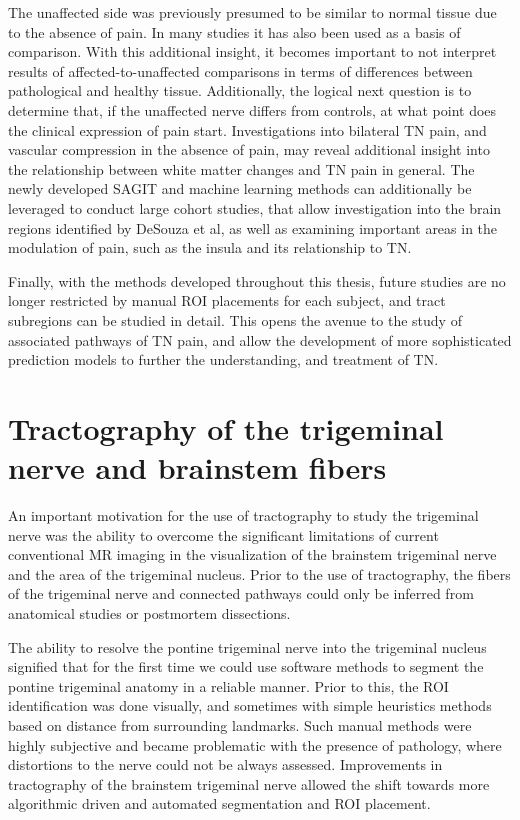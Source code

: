The unaffected side was previously presumed to be similar to normal tissue due to the absence of pain. In many studies it has also been used as a basis of comparison. With this additional insight, it becomes important to not interpret results of affected-to-unaffected comparisons in terms of differences between pathological and healthy tissue. Additionally, the logical next question is to determine that, if the unaffected nerve differs from controls, at what point does the clinical expression of pain start. Investigations into bilateral TN pain, and vascular compression in the absence of pain, may reveal additional insight into the relationship between white matter changes and TN pain in general. The newly developed SAGIT and machine learning methods can additionally be leveraged to conduct large cohort studies, that allow investigation into the brain regions identified by DeSouza et al, as well as examining important areas in the modulation of pain, such as the insula and its relationship to TN. 

Finally, with the methods developed throughout this thesis, future studies are no longer restricted by manual ROI placements for each subject, and tract subregions can be studied in detail. This opens the avenue to the study of associated pathways of TN pain, and allow the development of more sophisticated prediction models to further the understanding, and treatment of TN. 

\section{Tractography of the trigeminal nerve and brainstem fibers}

An important motivation for the use of tractography to study the trigeminal nerve was the ability to overcome the significant limitations of current conventional MR imaging in the visualization of the brainstem trigeminal nerve and the area of the trigeminal nucleus. Prior to the use of tractography, the fibers of the trigeminal nerve and connected pathways could only be inferred from anatomical studies or postmortem dissections. 

The ability to resolve the pontine trigeminal nerve into the trigeminal nucleus signified that for the first time we could use software methods to segment the pontine trigeminal anatomy in a reliable manner. Prior to this, the ROI identification was done visually, and sometimes with simple heuristics methods based on distance from surrounding landmarks. Such manual methods were highly subjective and became problematic with the presence of pathology, where distortions to the nerve could not be always assessed. Improvements in tractography of the brainstem trigeminal nerve allowed the shift towards more algorithmic driven and automated segmentation and ROI placement.

